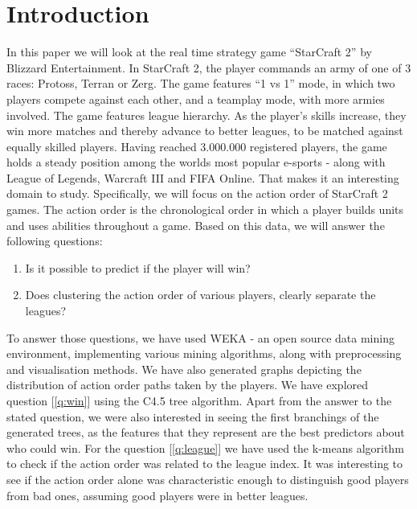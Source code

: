 \documentclass[a4paper,11pt]{article}
\begin{document}
\section{Introduction}
In this paper we will look at the real time strategy game “StarCraft 2” by Blizzard Entertainment. 
In StarCraft 2, the player commands an army of one of 3 races: Protoss, Terran or Zerg. The game features “1 vs 1” mode, in which two players compete against each other, and a teamplay mode, with more armies involved.
The game features league hierarchy. As the player’s skills increase, they win more matches and thereby advance to better leagues, to be matched against equally skilled players. Having reached 3.000.000 registered players, the game holds a steady position among the worlds most popular e-sports - along with League of Legends, Warcraft III and FIFA Online. That makes it an interesting domain to study.
Specifically, we will focus on the action order of StarCraft 2 games. The action order is the chronological order in which a player builds units and uses abilities throughout a game. Based on this data, we will answer the following questions:
\begin{enumerate}
\item Is it possible to predict if the player will win?\label{q:win}
\item Does clustering the action order of various players, clearly separate the leagues?\label{q:league}
\end{enumerate}

To answer those questions, we have used WEKA - an open source data mining environment, implementing various mining algorithms, along with preprocessing and visualisation methods. We have also generated graphs depicting the distribution of action order paths taken by the players.
We have explored question [\ref{q:win}] using the C4.5 tree algorithm. Apart from the answer to the stated question, we were also interested in seeing the first branchings of the generated trees, as the features that they represent are the best predictors about who could win. 
For the question [\ref{q:league}] we have used the k-means algorithm to check if the action order was related to the league index. It was interesting to see if the action order alone was characteristic enough to distinguish good players from bad ones, assuming good players were in better leagues.
\end{document}
